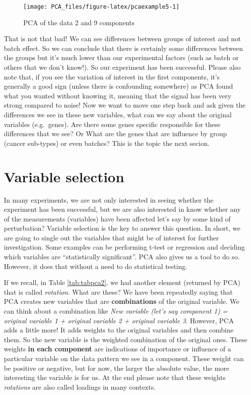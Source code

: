 \documentclass[
]{book}
\theoremstyle{definition}
\theoremstyle{definition}
\theoremstyle{definition}
\theoremstyle{remark}
\begin{document}
\begin{figure}

{\centering \texttt{[image: PCA\_files/figure-latex/pcaexample5-1]} 

}

\caption{PCA of the data 2 and 9 components}\label{fig:pcaexample5}
\end{figure}

That is not that bad! We can see differences between groups of interest and not batch effect. So we can conclude that there is certainly some differences between the groups but it's much lower than our experimental factors (such as batch or others that we don't know!). So our experiment has been successful. Please also note that, if you see the variation of interest in the first components, it's generally a good sign (unless there is confounding somewhere) as PCA found what you wanted without knowing it, meaning that the signal has been very strong compared to noise! Now we want to move one step back and ask given the differences we see in these new variables, what can we say about the original variables (e.g.~genes). Are there some genes specific responsible for these differences that we see? Or What are the genes that are influence by group (cancer sub-types) or even batches? This is the topic the next secion.

\hypertarget{pcavarselect}{%
\section{Variable selection}\label{pcavarselect}}

In many experiments, we are not only interested in seeing whether the experiment has been successful, but we are also interested in know whether any of the measurements (variables) have been affected let's say by some kind of perturbation? Variable selection is the key to answer this question. In short, we are going to single out the variables that might be of interest for further investigation. Some examples can be performing t-test or regression and deciding which variables are ``statistically significant''. PCA also gives us a tool to do so. However, it does that without a need to do statistical testing.

If we recall, in Table \ref{tab:tabpca2}, we had another element (returned by PCA) that is called \emph{rotation}. What are these? We have been repeatedly saying that PCA creates new variables that are \textbf{combinations} of the original variable. We can think about a combination like \emph{New variable (let's say component 1) = original variable 1 + original variable 2 + original variable 3}. However, PCA adds a little more! It adds weights to the original variables and then combine them. So the new variable is the weighted combination of the original ones. These weights \textbf{in each component} are indications of importance or influence of a particular variable on the data pattern we see in a component. These weight can be positive or negative, but for now, the larger the absolute value, the more interesting the variable is for us. At the end please note that these weights \emph{rotations} are also called loadings in many contexts.
\end{document}
